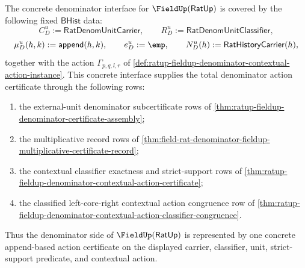 \begin{theorem}
\label{thm:field-rat-denominator-contextual-action-total-certificate}
The concrete denominator interface for $\FieldUp(\mathsf{RatUp})$ is covered by
the following fixed $\mathsf{BHist}$ data:
$$
C_D^u:=\mathsf{RatDenomUnitCarrier},\qquad
R_D^u:=\mathsf{RatDenomUnitClassifier},
$$
$$
\mu_D^u(h,k):=\mathsf{append}(h,k),\qquad
e_D^u:=\emp,\qquad
N_D^u(h):=\mathsf{RatHistoryCarrier}(h),
$$
together with the action $\Gamma_{p,q,l,r}$ of
\autoref{def:ratup-fieldup-denominator-contextual-action-instance}. This
concrete interface supplies the total denominator action certificate through
the following rows:
\begin{enumerate}
  \item the external-unit denominator subcertificate rows of
  \autoref{thm:ratup-fieldup-denominator-certificate-assembly};
  \item the multiplicative record rows of
  \autoref{thm:field-rat-denominator-fieldup-multiplicative-certificate-record};
  \item the contextual classifier exactness and strict-support rows of
  \autoref{thm:ratup-fieldup-denominator-contextual-action-certificate};
  \item the classified left-core-right contextual action congruence row of
  \autoref{thm:ratup-fieldup-denominator-contextual-action-classifier-congruence}.
\end{enumerate}
Thus the denominator side of $\FieldUp(\mathsf{RatUp})$ is represented by one
concrete append-based action certificate on the displayed carrier, classifier,
unit, strict-support predicate, and contextual action.
\end{theorem}

